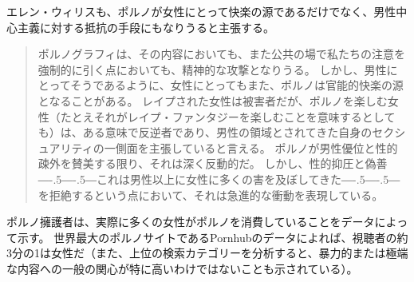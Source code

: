 \documentclass[paper=a4,book,openany]{jlreq}
\def\DDASH{―\kern-.5\zw―\kern-.5\zw―} %
\begin{document}
エレン・ウィリスも、ポルノが女性にとって快楽の源であるだけでなく、男性中心主義に対する抵抗の手段にもなりうると主張する。

\begin{quote}
ポルノグラフィは、その内容においても、また公共の場で私たちの注意を強制的に引く点においても、精神的な攻撃となりうる。
しかし、男性にとってそうであるように、女性にとってもまた、ポルノは官能的快楽の源となることがある。
レイプされた女性は被害者だが、ポルノを楽しむ女性（たとえそれがレイプ・ファンタジーを楽しむことを意味するとしても）は、ある意味で反逆者であり、男性の領域とされてきた自身のセクシュアリティの一側面を主張していると言える。
ポルノが男性優位と性的疎外を賛美する限り、それは深く反動的だ。
しかし、性的抑圧と偽善{\DDASH}これは男性以上に女性に多くの害を及ぼしてきた{\DDASH}を拒絶するという点において、それは急進的な衝動を表現している。
\citep[pp.83-84]{willis84:_femin_moral_pornog}
\end{quote}

ポルノ擁護者は、実際に多くの女性がポルノを消費していることをデータによって示す。
世界最大のポルノサイトであるPornhubのデータによれば、視聴者の約3分の1は女性だ（また、上位の検索カテゴリーを分析すると、暴力的または極端な内容への一般の関心が特に高いわけではないことも示されている）\citep{insights19:_year_review}。
\end{document}
